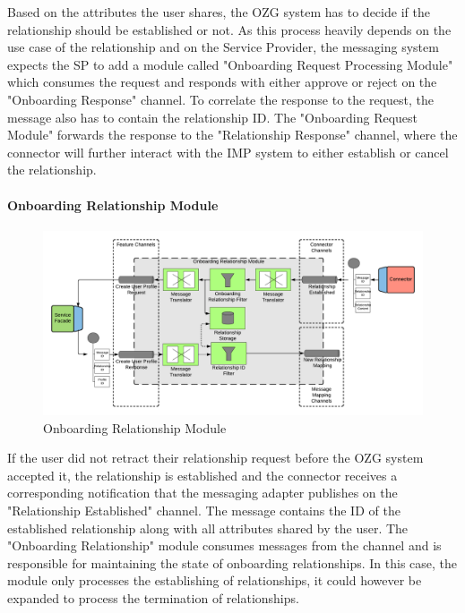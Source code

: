 Based on the attributes the user shares, the OZG system has to decide if the relationship should be established or not. As this process heavily depends on the use case of the relationship and on the Service Provider, the messaging system expects the SP to add a module called "Onboarding Request Processing Module" which consumes the request and responds with either approve or reject on the "Onboarding Response" channel. To correlate the response to the request, the message also has to contain the relationship ID. The "Onboarding Request Module" forwards the response to the "Relationship Response" channel, where the connector will further interact with the IMP system to either establish or cancel the relationship.

\paragraph{Onboarding Relationship Module}

\begin{figure}[h!]
    \centering
    \includegraphics[scale=0.6]{Diagrams/Integration Architecture 1/Technological Integration/8. Onboarding Relationship Module.pdf}
    \caption{Onboarding Relationship Module}
    \label{integration1:onboarding_relationship_module}
\end{figure}

If the user did not retract their relationship request before the OZG system accepted it, the relationship is established and the connector receives a corresponding notification that the messaging adapter publishes on the "Relationship Established" channel. The message contains the ID of the established relationship along with all attributes shared by the user. The "Onboarding Relationship" module consumes messages from the channel and is responsible for maintaining the state of onboarding relationships. In this case, the module only processes the establishing of relationships, it could however be expanded to process the termination of relationships.

